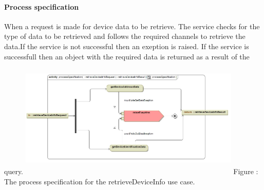 \documentclass[hidelinks, 12pt, oneside]{article}
\begin{document}
		\paragraph{Process specification}
		When a request is made for device data to be retrieve. The service checks for the type of data to 			be retrieved and follows the required channels to retrieve the data.If the service is not 					successful then an exeption is raised. If the service is successfull then an object with the 				required data is returned as a result of the query.\newline\newline
		\includegraphics[width=400px,height=220px]{img/processSpecificationRetrieveDeviceInfo.jpg}
		Figure : The process specification for the retrieveDeviceInfo use case.
		
\end{document}
